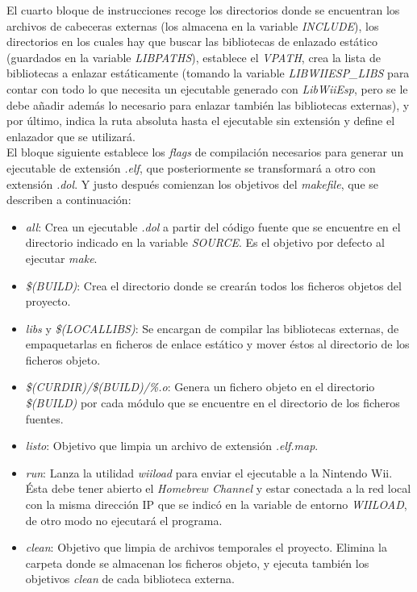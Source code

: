 El cuarto bloque de instrucciones recoge los directorios donde se encuentran los archivos de cabeceras externas (los almacena en la variable \emph{INCLUDE}), los directorios en los cuales hay que buscar las bibliotecas de enlazado estático (guardados en la variable \emph{LIBPATHS}), establece el \emph{VPATH}, crea la lista de bibliotecas a enlazar estáticamente (tomando la variable \emph{LIBWIIESP\_LIBS} para contar con todo lo que necesita un ejecutable generado con \emph{LibWiiEsp}, pero se le debe añadir además lo necesario para enlazar también las bibliotecas externas), y por último, indica la ruta absoluta hasta el ejecutable sin extensión y define el enlazador que se utilizará. \\

El bloque siguiente establece los \emph{flags} de compilación necesarios para generar un ejecutable de extensión \emph{.elf}, que posteriormente se transformará a otro con extensión \emph{.dol}. Y justo después comienzan los objetivos del \emph{makefile}, que se describen a continuación:

\begin{itemize}
\item \emph{all}: Crea un ejecutable \emph{.dol} a partir del código fuente que se encuentre en el directorio indicado en la variable \emph{SOURCE}. Es el objetivo por defecto al ejecutar \emph{make}.
\item \emph{\$(BUILD)}: Crea el directorio donde se crearán todos los ficheros objetos del proyecto.
\item \emph{libs} y \emph{\$(LOCALLIBS)}: Se encargan de compilar las bibliotecas externas, de empaquetarlas en ficheros de enlace estático y mover éstos al directorio de los ficheros objeto.
\item \emph{\$(CURDIR)/\$(BUILD)/\%.o}: Genera un fichero objeto en el directorio \emph{\$(BUILD)} por cada módulo que se encuentre en el directorio de los ficheros fuentes.
\item \emph{listo}: Objetivo que limpia un archivo de extensión \emph{.elf.map}.
\item \emph{run}: Lanza la utilidad \emph{wiiload} para enviar el ejecutable a la Nintendo Wii. Ésta debe tener abierto el \emph{Homebrew Channel} y estar conectada a la red local con la misma dirección IP que se indicó en la variable de entorno \emph{WIILOAD}, de otro modo no ejecutará el programa.
\item \emph{clean}: Objetivo que limpia de archivos temporales el proyecto. Elimina la carpeta donde se almacenan los ficheros objeto, y ejecuta también los objetivos \emph{clean} de cada biblioteca externa.
\end{itemize}

